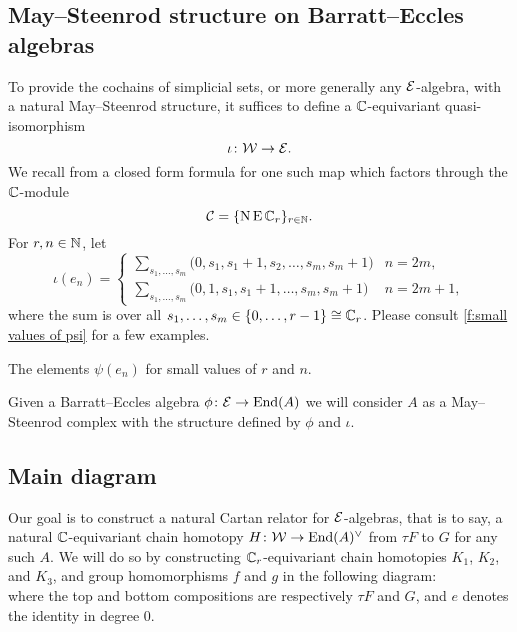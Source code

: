 \subsection{May--Steenrod structure on Barratt--Eccles algebras}

To provide the cochains of simplicial sets, or more generally any $\mathcal{E}$-algebra, with a natural May--Steenrod structure, it suffices to define a $\mathbb{C}$-equivariant quasi-isomorphism
\[
\iota \colon \mathcal{W} \to \mathcal{E}.
\]
We recall from \cite{medina2021may_st} a closed form formula for one such map which factors through the $\mathbb{C}$-module
\[
\mathcal{C} = \{\operatorname{N}\operatorname{E}\mathbb{C}_r\}_{r\in\mathbb{N}}.
\]
For $r,n\in\mathbb{N}$, let
\begin{equation*}
	\iota(e_{n}) =
	\begin{cases}
		\displaystyle{\sum_{s_1, \dots, s_m}} \big(0, {s_1}, {s_1+1}, {s_2}, \dots, {s_{m}}, {s_{m}+1} \big) & n = 2m, \\
		\displaystyle{\sum_{s_1, \dots, s_m}} \big(0, 1, {s_1}, {s_1+1}, \dots, {s_{m}}, {s_{m}+1} \big) & n = 2m+1,
	\end{cases}
\end{equation*}
where the sum is over all $s_1, \dots, s_m \in \{0, \dots, r-1\} \cong \mathbb{C}_r$.
Please consult \cref{f:small values of psi} for a few examples.

\begin{table}
	\centering
	
	\caption{The elements $\psi(e_n)$ for small values of $r$ and $n$.}
	\label{f:small values of psi}
\end{table}

Given a Barratt--Eccles algebra $\phi \colon \mathcal{E} \to \mathrm{End}(A)$ we will consider $A$ as a May--Steenrod complex with the structure defined by $\phi$ and $\iota$.

\subsection{Main diagram}

Our goal is to construct a natural Cartan relator for $\mathcal{E}$-algebras, that is to say, a natural $\mathbb{C}$-equivariant chain homotopy $H \colon \mathcal{W} \to \mathrm{End}(A)^\vee$ from $\tau F$ to $G$ for any such $A$.
We will do so by constructing $\mathbb{C}_r$-equivariant chain homotopies $K_1$, $K_2$, and $K_3$, and group homomorphisms $f$ and $g$ in the following diagram:
\begin{equation}\label{d:big diagram}
	
\end{equation}
where the top and bottom compositions are respectively $\tau F$ and $G$, and $e$ denotes the identity in degree $0$.

